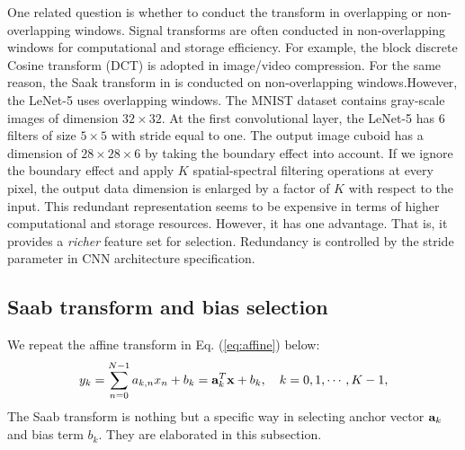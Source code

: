\documentclass[preprint,12pt]{elsarticle}
\begin{document}
One related question is whether to conduct the transform in overlapping or non-overlapping windows. Signal transforms are often 
conducted in non-overlapping windows for computational and storage 
efficiency. For example, the block discrete Cosine transform (DCT) is 
adopted in image/video compression.  For the same reason, the Saak 
transform in \cite{kuo2018data} is conducted on non-overlapping 
windows.However, the LeNet-5 uses overlapping windows. The MNIST dataset
contains gray-scale images of dimension $32 \times 32$.  At the first
convolutional layer, the LeNet-5 has 6 filters of size $5\times 5$ with
stride equal to one. The output image cuboid has a dimension of $28
\times 28 \times 6$ by taking the boundary effect into account.  If we
ignore the boundary effect and apply $K$ spatial-spectral filtering
operations at every pixel, the output data dimension is enlarged by a
factor of $K$ with respect to the input.  This redundant representation
seems to be expensive in terms of higher computational and storage
resources.  However, it has one advantage. That is, it provides a {\em
richer} feature set for selection. Redundancy is controlled by the
stride parameter in CNN architecture specification. 


\subsection{Saab transform and bias selection}\label{subsec:bias}

We repeat the affine transform in Eq. (\ref{eq:affine}) below:
\begin{equation}\label{eq:affine_r}
y_k = \sum_{n=0}^{N-1} a_{k,n} x_n + b_k = {\bf a}_k^T {\bf x} 
+ b_k, \quad k=0, 1, \cdots, K-1,
\end{equation}
The Saab transform is nothing but a specific way in selecting anchor
vector ${\bf a}_k$ and bias term $b_k$. They are elaborated in this
subsection. 
\end{document}
